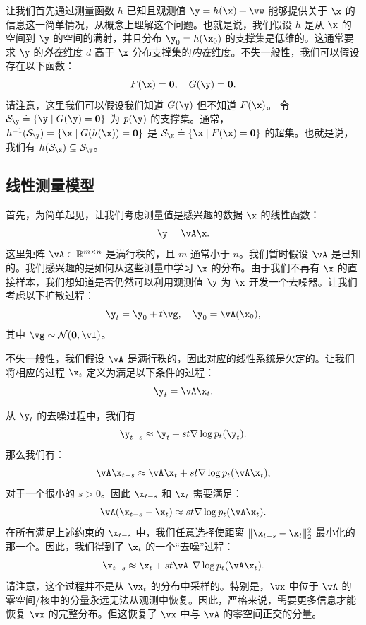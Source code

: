 \documentclass[../../book-main_zh.tex]{subfiles}
\begin{document}
让我们首先通过测量函数 $h$ 已知且观测值 $\y = h(\x) + \vw$ 能够提供关于 $\x$ 的信息这一简单情况，从概念上理解这个问题。也就是说，我们假设 $h$ 是从 $\x$ 的空间到 $\y$ 的空间的满射，并且分布 $\y_0 = h(\x_0)$ 的支撑集是低维的。这通常要求 $\y$ 的\textit{外在}维度 $d$ 高于 $\x$ 分布支撑集的\textit{内在}维度。不失一般性，我们可以假设存在以下函数：
\begin{equation}
    F(\x) = \boldsymbol{0},\quad     G(\y) = \boldsymbol{0}.
\end{equation}
请注意，这里我们可以假设我们知道 $G(\y)$ 但不知道 $F(\x)$。
令 $\mathcal{S}_{\y} \doteq \{\y \mid G(\y) = \boldsymbol{0}\}$ 为 $p(\y)$ 的支撑集。通常，$h^{-1}(\mathcal{S}_{\y}) = \{\x
\mid G(h(\x)) = \boldsymbol{0}\}$ 是 $\mathcal{S}_{\x}
\doteq \{\x \mid F(\x) = \boldsymbol{0}\}$ 的超集。也就是说，我们有 $h(\mathcal{S}_{\x}) \subseteq \mathcal{S}_{\y}$。

\subsection{线性测量模型}
首先，为简单起见，让我们考虑测量值是感兴趣的数据 $\x$ 的线性函数：
\begin{equation}
    \y = \vA\x.
\end{equation}
这里矩阵 $\vA \in \mathbb{R}^{m\times n}$ 是满行秩的，且 $m$ 通常小于 $n$。我们暂时假设 $\vA$ 是已知的。我们感兴趣的是如何从这些测量中学习 $\x$ 的分布。由于我们不再有 $\x$ 的直接样本，我们想知道是否仍然可以利用观测值 $\y$ 为 $\x$ 开发一个去噪器。让我们考虑以下扩散过程：
\begin{equation}
    \y_t = \y_0 + t \vg, \quad \y_0 = \vA(\x_0),
\end{equation}
其中 $\vg \sim \mathcal{N}(\boldsymbol{0}, \vI)$。

不失一般性，我们假设 $\vA$ 是满行秩的，因此对应的线性系统是欠定的。让我们将相应的过程 $\x_t$ 定义为满足以下条件的过程：
\begin{equation}
    \y_t = \vA \x_t.
\end{equation}

从 $\y_t$ 的去噪过程中，我们有
\begin{equation}
    \y_{t-s} \approx  \y_t + st \nabla \log p_t(\y_t).
\end{equation}
那么我们有：
\begin{equation}
    \vA\x_{t-s} \approx   \vA\x_t + st \nabla \log p_t(\vA \x_t),
\end{equation}
对于一个很小的 $s >0$。因此 $\x_{t-s}$ 和 $\x_t$ 需要满足：
\begin{equation}
    \vA(\x_{t-s} - \x_t) \approx st \nabla \log p_t(\vA\x_t).
\end{equation}
在所有满足上述约束的 $\x_{t-s}$ 中，我们任意选择使距离 $\|\x_{t-s} -
\x_t\|_2^2$ 最小化的那一个。因此，我们得到了 $\x_t$ 的一个“去噪”过程：
\begin{equation}
    \x_{t-s}  \approx \x_t + st\vA^\dagger \nabla \log p_t(\vA\x_t).
    \label{eqn:denoising-projection}
\end{equation}
请注意，这个过程并不是从 $\vx_t$ 的分布中采样的。特别是，$\vx$ 中位于 $\vA$ 的零空间/核中的分量永远无法从观测中恢复。因此，严格来说，需要更多信息才能恢复 $\vx$ 的完整分布。但这恢复了 $\vx$ 中与 $\vA$ 的零空间正交的分量。
\end{document}
